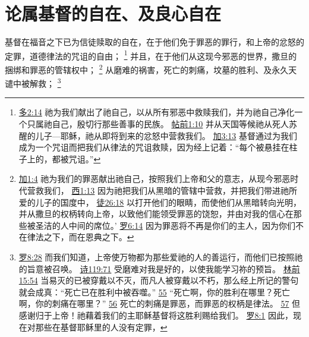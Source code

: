 \documentclass[12pt, a4paper, oneside]{ctexart}
\newcounter{parnum}[section]
\newcommand{\N}{%
   \noindent\refstepcounter{parnum}%
    \makebox[\parindent][l]{\textbf{\arabic{parnum}.}}}
\begin{document}
\section{论属基督的自在、及良心自在}

\N 基督在福音之下已为信徒赎取的自在，在于他们免于罪恶的罪行，和上帝的忿怒的定罪，道德律法的咒诅的自由；
	\footnote {
		\href{https://biblehub.com/titus/2-14.htm}{多2:14} 祂为我们献出了祂自己，以从所有邪恶中救赎我们，并为祂自己净化一个只属祂自己，殷切行那些善事的民族。
		\href{https://biblehub.com/1_thessalonians/1-10.htm}{帖前1:10} 并从天国等候祂从死人苏醒的儿子---耶稣，祂从即将到来的忿怒中营救我们。
		\href{https://biblehub.com/galatians/3-13.htm}{加3:13} 基督通过为我们成为一个咒诅而把我们从律法的咒诅救赎，因为经上记着：“每个被悬挂在柱子上的，都被咒诅。”
	}
	并且，在于他们从这现今邪恶的世界，撒旦的捆绑和罪恶的管辖权中；
	\footnote {
		\href{https://biblehub.com/galatians/1-4.htm}{加1:4} 祂为我们的罪恶献出祂自己，按照我们上帝和父的意志，从现今邪恶时代营救我们，
		\href{https://biblehub.com/colossians/1-13.htm}{西1:13} 因为祂把我们从黑暗的管辖中营救，并把我们带进祂所爱的儿子的国度中，
		\href{https://biblehub.com/acts/26-18.htm}{徒26:18} 以打开他们的眼睛，而使他们从黑暗转向光明，并从撒旦的权柄转向上帝，以致他们能领受罪恶的饶恕，并由对我的信心在那些被圣洁的人中间的席位。’
		\href{https://biblehub.com/romans/6-14.htm}{罗6:14} 因为罪恶将不再是你们的主人，因为你们不在律法之下，而在恩典之下。
	}
	从磨难的祸害，死亡的刺痛，坟墓的胜利、及永久天谴中被解救；
	\footnote {
		\href{https://biblehub.com/romans/8-28.htm}{罗8:28} 而我们知道，上帝使万物都为那些爱祂的人的善运行，而他们已按照祂的旨意被召唤。
		\href{https://biblehub.com/psalms/119-71.htm}{诗119:71} 受磨难对我是好的，以使我能学习祢的预旨。
		\href{https://biblehub.com/1_corinthians/15-54.htm}{林前15:54} 当易灭的已被穿戴以不灭，而凡人被穿戴以不朽，那么经上所记的警句就会成真：“死亡已在胜利中被吞噬。”
		\href{https://biblehub.com/1_corinthians/15-55.htm}{55} “死亡啊，你的胜利在哪里？死亡啊，你的刺痛在哪里？”
		\href{https://biblehub.com/1_corinthians/15-56.htm}{56} 死亡的刺痛是罪恶，而罪恶的权柄是律法。
		\href{https://biblehub.com/1_corinthians/15-57.htm}{57} 但感谢归于上帝！祂藉着我们的主耶稣基督将这胜利赐给我们。
		\href{https://biblehub.com/romans/8-1.htm}{罗8:1} 因此，现在对那些在基督耶稣里的人没有定罪，
	}
\end{document}

